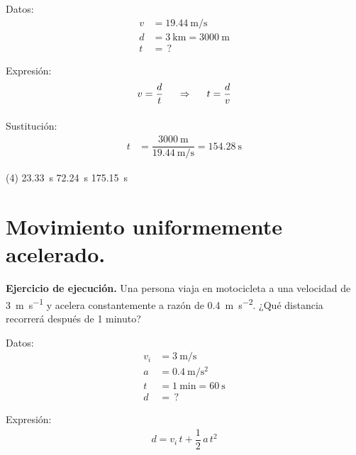 \documentclass[12pt, letter]{exam}
\begin{document}
\begin{questions}
    \begin{minipage}[t]{0.35\linewidth}
    Datos: 
    \begin{align*}
    v &= \SI{19.44}{\meter\per\second} \\
    d &= \SI{3}{\kilo\meter} = \SI{3000}{\meter} \\
    t &= \, ?
    \end{align*}
    \end{minipage}
    \hspace{1cm}
    \begin{minipage}[t]{0.4\linewidth}
    Expresión:
    \begin{align*}
    v &= \dfrac{d}{t} \hspace{0.5cm} \Rightarrow \hspace{0.5cm} t = \dfrac{d}{v} \\[0.5em]
    \end{align*}
    \end{minipage}

    Sustitución:
    \begin{align*}
    t &= \dfrac{\SI{3000}{\meter}}{\displaystyle \SI[per-mode=fraction]{19.44}{\meter\per\second}} = \SI{154.28}{\second}
    \end{align*}
    \begin{tasks}(4)
        \task \SI{23.33}{\second}
        \task \SI{72.24}{\second}
        \task {}
        \task \SI{175.15}{\second}
    \end{tasks}

    \newpage

    \section{Movimiento uniformemente acelerado.}

    \setcounter{question}{9} \question \label{Ejercicio_04} \textbf{Ejercicio de ejecución. } Una persona viaja en motocicleta a una velocidad de \SI{3}{\meter\per\second} y acelera constantemente a razón de \SI{0.4}{\meter\per\square\second}. ¿Qué distancia recorrerá después de 1 minuto?
    
    \begin{minipage}[t]{0.35\linewidth}
    Datos: 
    \begin{align*}
    v_{i} &= \SI{3}{\meter\per\second} \\
    a &= \SI{0.4}{\meter\per\square\second} \\
    t &= \SI{1}{\minute} = \SI{60}{\second} \\
    d &= \, ?
    \end{align*}
    \end{minipage}
    \hspace{1cm}
    \begin{minipage}[t]{0.4\linewidth}
    Expresión:
    \begin{align*}
    d = v_{i} \, t + \dfrac{1}{2} \, a \, t^{2}
    \end{align*}
    \end{minipage}


\end{questions}
\end{document}
